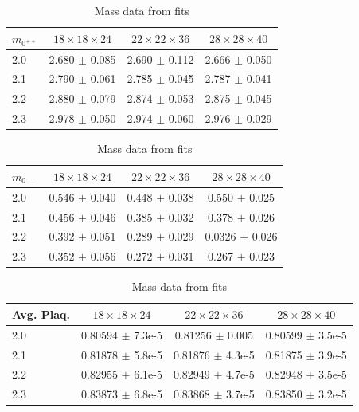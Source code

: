 \documentclass[12pt]{article}
\begin{document}
\begin{table}
  \centering
  \begin{minipage}[c]{\linewidth}
  \centering
    \begin{tabular}{l|c|c|c}
$m_{0^{++}}$ & $18\times 18 \times 24$ & $22\times 22\times 36$ & $28\times 28\times 40$ \\ \hline
2.0          & 2.680 $\pm$ 0.085       & 2.690 $\pm$ 0.112     & 2.666 $\pm$  0.050  \\
2.1          & 2.790 $\pm$ 0.061       & 2.785 $\pm$ 0.045     & 2.787 $\pm$  0.041  \\
2.2          & 2.880 $\pm$ 0.079       & 2.874 $\pm$ 0.053     & 2.875 $\pm$ 0.045  \\
2.3          & 2.978 $\pm$ 0.050       & 2.974 $\pm$ 0.060     & 2.976 $\pm$  0.029   
\end{tabular}
  \end{minipage}
  \newline
\vspace*{0.5 cm}
\newline
  \begin{minipage}[c]{\linewidth}
  \centering
    \begin{tabular}{l|c|c|c}
$m_{0^{--}}$ & $18\times 18 \times 24$ & $22\times 22\times 36$ & $28\times 28\times 40$ \\ \hline
2.0          & 0.546 $\pm$ 0.040  & 0.448 $\pm$ 0.038  & 0.550 $\pm$ 0.025   \\
2.1          & 0.456 $\pm$ 0.046  & 0.385 $\pm$ 0.032  & 0.378 $\pm$ 0.026   \\
2.2          & 0.392 $\pm$ 0.051  & 0.289 $\pm$ 0.029  & 0.0326 $\pm$ 0.026   \\
2.3          & 0.352 $\pm$ 0.056  & 0.272 $\pm$ 0.031  & 0.267 $\pm$ 0.023  
\end{tabular}
  \end{minipage}
  \newline
\vspace*{0.5 cm}
\newline
  \begin{minipage}[c]{\linewidth}
  \centering
    \begin{tabular}{l|c|c|c}
Avg. Plaq. & $18\times 18 \times 24$ & $22\times 22\times 36$ & $28\times 28\times 40$ \\ \hline
2.0         &   0.80594 $\pm$ 7.3e-5  &  0.81256 $\pm$ 0.005   & 0.80599 $\pm$ 3.5e-5 \\
2.1         &   0.81878 $\pm$ 5.8e-5  &  0.81876 $\pm$ 4.3e-5  & 0.81875 $\pm$ 3.9e-5 \\
2.2         &   0.82955 $\pm$ 6.1e-5  &  0.82949 $\pm$ 4.7e-5  & 0.82948 $\pm$ 3.5e-5 \\
2.3         &   0.83873 $\pm$ 6.8e-5  &  0.83868 $\pm$ 3.7e-5  & 0.83850 $\pm$ 3.2e-5 
\end{tabular}
  \end{minipage}
\caption{Mass data from fits}
\label{tab:massfitting}
\end{table}
\end{document}
